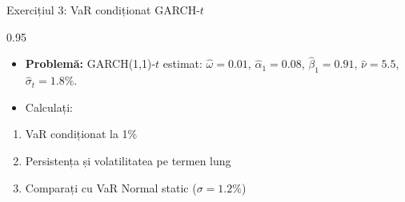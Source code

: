 \documentclass[9pt, aspectratio=169, t]{beamer}
\begin{document}
\begin{frame}{Exercițiul 3: VaR condiționat GARCH-$t$}
    \begin{cminipage}{0.95\textwidth}
    \begin{itemize}\setlength{\itemsep}{0pt}
        \item \textbf{Problemă:} GARCH(1,1)-$t$ estimat: $\hat{\omega} = 0.01$, $\hat{\alpha}_1 = 0.08$, $\hat{\beta}_1 = 0.91$, $\hat{\nu} = 5.5$, $\hat{\sigma}_t = 1.8\%$.
    \end{itemize}

    \begin{itemize}\setlength{\itemsep}{0pt}
        \item Calculați:
    \end{itemize}
    \begin{enumerate}\setlength{\itemsep}{0pt}
        \item VaR condiționat la 1\%
        \item Persistența și volatilitatea pe termen lung
        \item Comparați cu VaR Normal static ($\sigma = 1.2\%$)
    \end{enumerate}
    \end{cminipage}
\end{frame}
\end{document}
